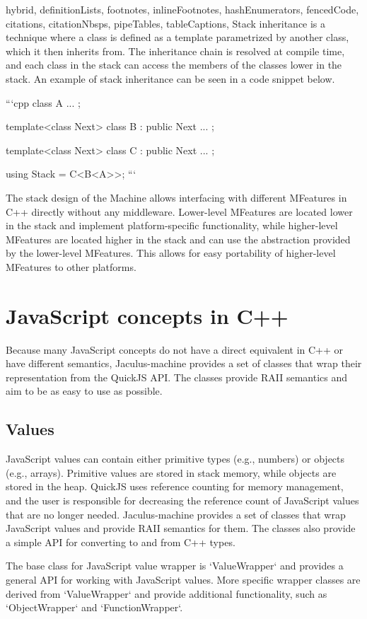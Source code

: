 \begin{markdown*}{%
  hybrid,
  definitionLists,
  footnotes,
  inlineFootnotes,
  hashEnumerators,
  fencedCode,
  citations,
  citationNbsps,
  pipeTables,
  tableCaptions,
}
Stack inheritance is a technique where a class is defined as a template parametrized by another class, which it then inherits from. The inheritance chain is resolved at compile time, and each class in the stack can access the members of the classes lower in the stack. An example of stack inheritance can be seen in a code snippet below.

```cpp
class A { ... };

template<class Next>
class B : public Next { ... };

template<class Next>
class C : public Next { ... };

using Stack = C<B<A>>;
```

The stack design of the Machine allows interfacing with different MFeatures in C++ directly without any middleware. Lower-level MFeatures are located lower in the stack and implement platform-specific functionality, while higher-level MFeatures are located higher in the stack and can use the abstraction provided by the lower-level MFeatures. This allows for easy portability of higher-level MFeatures to other platforms.

\section{JavaScript concepts in C++}

Because many JavaScript concepts do not have a direct equivalent in C++ or have different semantics, Jaculus-machine provides a set of classes that wrap their representation from the QuickJS API. The classes provide RAII semantics and aim to be as easy to use as possible.

\subsection{Values}

JavaScript values can contain either primitive types (e.g., numbers) or objects (e.g., arrays). Primitive values are stored in stack memory, while objects are stored in the heap. QuickJS uses reference counting for memory management, and the user is responsible for decreasing the reference count of JavaScript values that are no longer needed. Jaculus-machine provides a set of classes that wrap JavaScript values and provide RAII semantics for them. The classes also provide a simple API for converting to and from C++ types.

The base class for JavaScript value wrapper is `ValueWrapper` and provides a general API for working with JavaScript values. More specific wrapper classes are derived from `ValueWrapper` and provide additional functionality, such as `ObjectWrapper` and `FunctionWrapper`.


\end{markdown*}

